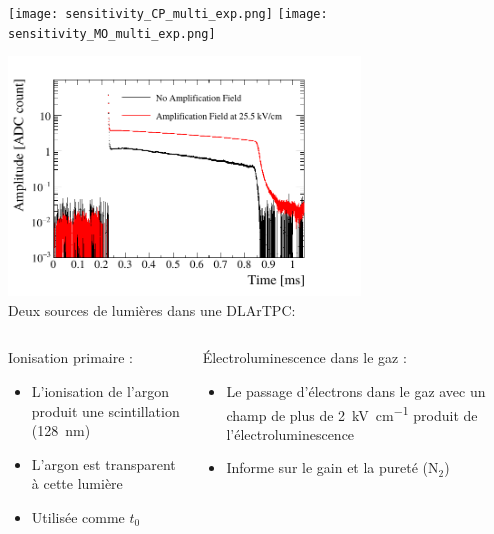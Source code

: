     {
            \begin{specialframe}
                \flushleft\hspace{-2cm}\texttt{[image: sensitivity\_CP\_multi\_exp.png]}
                \texttt{[image: sensitivity\_MO\_multi\_exp.png]}
            \end{specialframe}
        }
            
            \begin{specialframe}
                \begin{scriptsize}
                    \centering \includegraphics[width=0.7\textwidth]{./pictures/scintillation.pdf}\\\vfill
                    \centering Deux sources de lumières dans une DLArTPC:
                    \begin{columns}
                        \begin{column}{0.5\textwidth}
                            Ionisation primaire :
                            \begin{itemize}
                                \item L'ionisation de l'argon produit une scintillation (\SI{128}{\nano\meter})
                                \item L'argon est transparent à cette lumière
                                \item Utilisée comme $t_0$
                            \end{itemize}
                        \end{column}
                        \begin{column}{0.5\textwidth}
                            Électroluminescence dans le gaz :
                            \begin{itemize}
                                \item Le passage d'électrons dans le gaz avec un champ de plus de \SI{2}{\kilo\volt\per\centi\meter} produit de l'électroluminescence
                                \item Informe sur le gain et la pureté (N$_2$)
                            \end{itemize}
                        \end{column}
                    \end{columns}
                \end{scriptsize}
            \end{specialframe}
    

